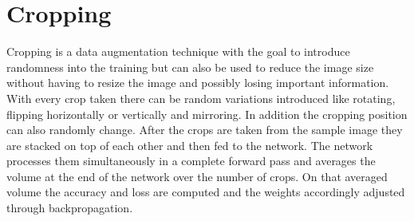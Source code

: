 \begin{table}[h]
    \caption{Different dataset variations. C stands for cleaned, CH stands fro cleaned heavily, B stands for balanced and EXTENDED stand for the variation where the validation images have additionally been copied into the training.}
    \centering
    \begin{small}
    \textsc{
    }
    \end{small}
    \vspace{-3.9mm}
    \label{tbl:dataset-variations}
\end{table}

\section{Cropping}

Cropping is a data augmentation technique with the goal to introduce randomness into the training but can also be used to reduce the image size without having to resize the image and possibly losing important information. With every crop taken there can be random variations introduced like rotating, flipping horizontally or vertically and mirroring. In addition the cropping position can also randomly change. After the crops are taken from the sample image they are stacked on top of each other and then fed to the network. The network processes them simultaneously in a complete forward pass and averages the volume at the end of the network over the number of crops. On that averaged volume the accuracy and loss are computed and the weights accordingly adjusted through backpropagation.

